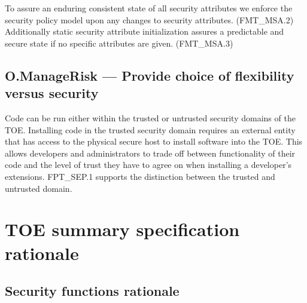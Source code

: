 \documentclass[12pt,english]{scrbook}
\begin{document}
    To assure an enduring consistent state of all security attributes we
    enforce the security policy model upon any changes to security attributes.
    (FMT\_MSA.2) Additionally static security attribute initialization assures
    a predictable and secure state if no specific attributes are given.
    (FMT\_MSA.3)

\subsection{O.ManageRisk --- Provide choice of flexibility versus security}
    
    Code can be run either within the trusted or untrusted security domains of
    the TOE. Installing code in the trusted security domain requires an
    external entity that has access to the physical secure host to install
    software into the TOE. This allows developers and administrators to trade
    off between functionality of their code and the level of trust they have to
    agree on when installing a developer's extensions. FPT\_SEP.1 supports the
    distinction between the trusted and untrusted domain.

\newpage

\section{TOE summary specification rationale}

\subsection{Security functions rationale}
\end{document}

